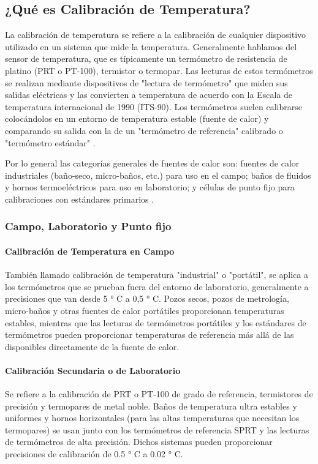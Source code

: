 \subsection{¿Qué es Calibración de Temperatura?}

\par 
La calibración de temperatura se refiere a la calibración de cualquier dispositivo utilizado en un sistema que mide la temperatura. Generalmente hablamos del sensor de temperatura, que es típicamente un termómetro de resistencia de platino (PRT o PT-100), termistor o termopar. Las lecturas de estos termómetros se realizan mediante dispositivos de "lectura de termómetro" que miden sus salidas eléctricas y las convierten a temperatura de acuerdo con la Escala de temperatura internacional de 1990 (ITS-90).
Los termómetros suelen calibrarse colocándolos en un entorno de temperatura estable (fuente de calor) y comparando su salida con la de un "termómetro de referencia" calibrado o "termómetro estándar" \cite{temperatura-fluke}. 

\par \noindent
Por lo general las categorías generales de fuentes de calor son: fuentes de calor industriales (baño-seco, micro-baños, etc.) para uso en el campo; baños de fluidos y hornos termoeléctricos para uso en laboratorio; y células de punto fijo para calibraciones con estándares primarios \cite{temperatura-fluke}.

\subsubsection{Campo, Laboratorio y Punto fijo }

\paragraph{Calibración de Temperatura en Campo}
También llamado calibración de temperatura "industrial" o "portátil", se aplica a los termómetros que se prueban fuera del entorno de laboratorio, generalmente a precisiones que van desde 5 ° C a 0,5 ° C. Pozos secos, pozos de metrología, micro-baños y otras fuentes de calor portátiles proporcionan temperaturas estables, mientras que las lecturas de termómetros portátiles y los estándares de termómetros pueden proporcionar temperaturas de referencia más allá de las disponibles directamente de la fuente de calor.\cite{temperatura-fluke}

\paragraph{Calibración Secundaria o de Laboratorio}
Se refiere a la calibración de PRT o PT-100 de grado de referencia, termistores de precisión y termopares de metal noble. Baños de temperatura ultra estables y uniformes y hornos horizontales (para las altas temperaturas que necesitan los termopares) se usan junto con los termómetros de referencia SPRT y las lecturas de termómetros de alta precisión. Dichos sistemas pueden proporcionar precisiones de calibración de 0.5 ° C a 0.02 ° C.\cite{temperatura-fluke}

